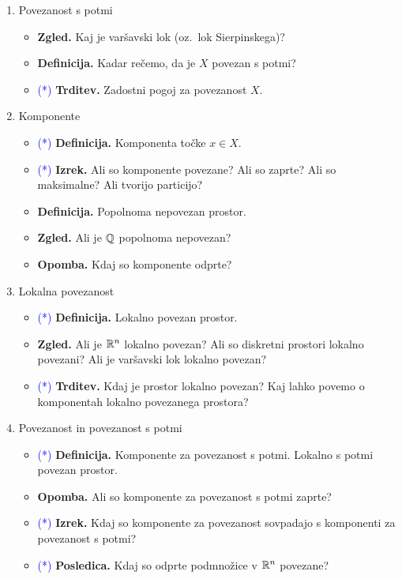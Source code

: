 \begin{enumerate}
    \item Povezanost s potmi
    \begin{itemize}
        \item \textbf{Zgled.} Kaj je varšavski lok (oz.\ lok Sierpinskega)?
        \item \textbf{Definicija.} Kadar rečemo, da je $X$ povezan s potmi?
        \item \textcolor{blue}{(*)} \textbf{Trditev.} Zadostni pogoj za povezanost $X$.
    \end{itemize}

    \item Komponente
    \begin{itemize}
        \item \textcolor{blue}{(*)} \textbf{Definicija.} Komponenta točke \(x \in X\).
        \item \textcolor{blue}{(*)} \textbf{Izrek.} Ali so komponente povezane? Ali so zaprte? Ali so maksimalne? Ali tvorijo particijo?
        \item \textbf{Definicija.} Popolnoma nepovezan prostor.
        \item \textbf{Zgled.} Ali je \(\mathbb{Q}\) popolnoma nepovezan?
        \item \textbf{Opomba.} Kdaj so komponente odprte?
    \end{itemize}

    \item Lokalna povezanost
    \begin{itemize}
        \item \textcolor{blue}{(*)} \textbf{Definicija.} Lokalno povezan prostor.
        \item \textbf{Zgled.} Ali je \(\mathbb{R}^n\) lokalno povezan? Ali so diskretni prostori lokalno povezani? Ali je varšavski lok lokalno povezan?
        \item \textcolor{blue}{(*)} \textbf{Trditev.} Kdaj je prostor lokalno povezan? Kaj lahko povemo o komponentah lokalno povezanega prostora?
    \end{itemize}

    \item Povezanost in povezanost s potmi
    \begin{itemize}
        \item \textcolor{blue}{(*)} \textbf{Definicija.} Komponente za povezanost s potmi. Lokalno s potmi povezan prostor.
        \item \textbf{Opomba.} Ali so komponente za povezanost s potmi zaprte? 
        \item \textcolor{blue}{(*)} \textbf{Izrek.} Kdaj so komponente za povezanost sovpadajo s komponenti za povezanost s potmi?
        \item \textcolor{blue}{(*)} \textbf{Posledica.} Kdaj so odprte podmnožice v \(\mathbb{R}^n\) povezane?
    \end{itemize}
\end{enumerate}

